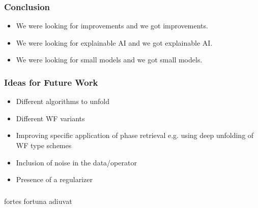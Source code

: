 
\begin{frame}
    \frametitle{Conclusion}
    \begin{itemize}
        \pause
        \item We were looking for improvements and we got improvements.
        \pause
        \item We were looking for explainable AI and we got explainable AI.
        \pause 
        \item We were looking for small models and we got small models.
    \end{itemize}
  \end{frame}
\begin{frame}
    \frametitle{Ideas for Future Work}
    \begin{itemize}
        \pause
        \item Different algorithms to unfold \cite{Monga2019}
        \pause
        \item Different \ac{WF} variants \cite{Jaganathan2015}\cite{Liu2019}\cite{Chandra2017}
        \pause
        \item Improving specific application of phase retrieval e.g. \cite{Fogel2013} using deep unfolding of \ac{WF} type schemes
        \pause
        \item Inclusion of noise in the data/operator
        \pause
        \item Presence of a regularizer
    \end{itemize}
  \end{frame}

  \begin{frame}
    \frametitle{}
    \begin{center}
      \Huge{fortes fortuna adiuvat}  
    \end{center}
  \end{frame}